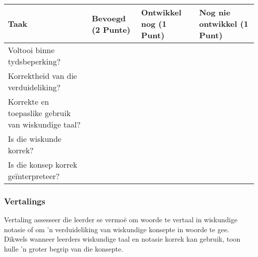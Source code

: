 \begin{table}[H]
 \begin{center}
  \begin{tabular}{|p{4cm}|p{2cm}|p{2.5cm}|p{3cm}|} \hline
  \textbf{Taak} & \textbf{Bevoegd \newline(2 Punte)} & \textbf{Ontwikkel nog \newline(1 Punt)}& \textbf{Nog nie ontwikkel \newline (1 Punt)}\\ \hline
Voltooi binne tydsbeperking? &&&\\ \hline
Korrektheid van die verduideliking? &&&\\ \hline
Korrekte en toepaslike gebruik van wiskundige taal? &&&\\ \hline
Is die wiskunde korrek? &&&\\ \hline
Is die konsep korrek ge\"{i}nterpreteer?&&&\\ \hline

  \end{tabular}

 \end{center}

\end{table}

\subsubsection{Vertalings}
Vertaling assesseer die leerder se vermoë om woorde te vertaal in wiskundige notasie of om 'n verduideliking van wiskundige konsepte in woorde te gee. Dikwels wanneer leerders wiskundige taal en notasie korrek kan gebruik, toon hulle 'n groter begrip van die konsepte.\par

